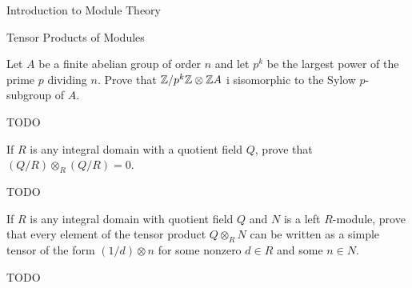\begin{chapter}{Introduction to Module Theory}
\begin{section}{Tensor Products of Modules}
\begin{problem}\label{ex:10.4.5}
Let $A$ be a finite abelian group of order $n$ and let $p^k$ be the largest power of the prime $p$ dividing $n$. Prove that $\mathbb{Z}/p^k\mathbb{Z}\otimes \mathbb{Z} A$ i sisomorphic to the Sylow $p$-subgroup of $A$. 
\end{problem}
\begin{solution}TODO

\end{solution}\oneperpage



\begin{problem}\label{ex:10.4.6}
If $R$ is any integral domain with a quotient field $Q$, prove that $(Q/R)\otimes_R(Q/R) = 0$.
\end{problem}
\begin{solution}TODO

\end{solution}\oneperpage



\begin{problem}\label{ex:10.4.7}
If $R$ is any integral domain with quotient field $Q$ and $N$ is a left $R$-module, prove that every element of the tensor product $Q\otimes_R N$ can be written as a simple tensor of the form $(1/d)\otimes n$ for some nonzero $d\in R$ and some $n\in N$. 
\end{problem}
\begin{solution}TODO

\end{solution}\oneperpage




\end{section}
\end{chapter}
